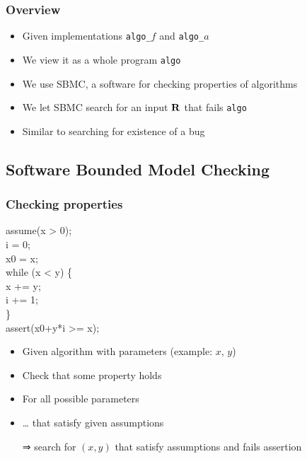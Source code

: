 \documentclass[french,english]{beamer}
\begin{document}
\begin{frame}
	\frametitle{Overview}
	\begin{itemize}
		\item Given implementations \texttt{algo\_$f$} and \texttt{algo\_$a$}
	\end{itemize}
	\centering
	\begin{itemize}
		\item We view it as a whole program \texttt{algo}
		\item We use SBMC, a software for checking properties of algorithms
		\item We let SBMC search for an input $\mathbf{R}$ that fails \texttt{algo}
		\item Similar to searching for existence of a bug
	\end{itemize}
\end{frame}

\subsection{Software Bounded Model Checking}
\begin{frame}
	\frametitle{Checking properties}
		assume(x > 0);\\
		i = 0;\\
		x0 = x;\\
		while (x < y) \{\\
		\hspace{2cm}	x += y;\\
		\hspace{2cm} i += 1;\\
		\}\\
		assert(x0+y*i >= x);
%		
	\begin{itemize}
		\item Given algorithm with parameters (example: $x$, $y$)
		\item Check that some property holds
		\item For all possible parameters
		\item … that satisfy given assumptions
		\item[⇒] search for $(x, y)$ that satisfy assumptions and fails assertion
	\end{itemize}
\end{frame}
\end{document}
